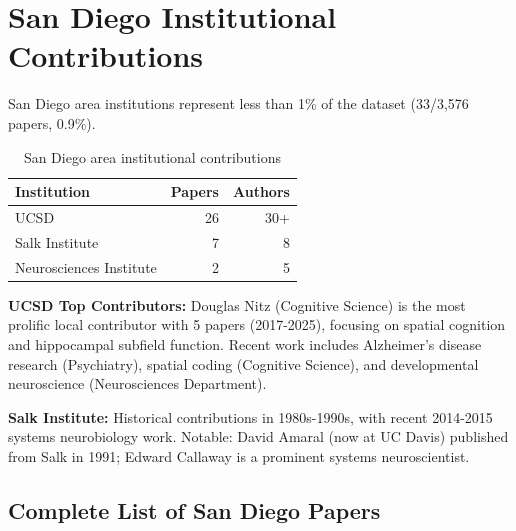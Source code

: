 \documentclass{../latex/analysis_report}
\begin{document}
\clearpage
\section{San Diego Institutional Contributions}
\label{app:sandiego}

San Diego area institutions represent less than 1\% of the dataset (33/3,576 papers, 0.9\%).

\begin{table}[htbp]
\centering
\caption{San Diego area institutional contributions}
\label{tab:sandiego-summary}
\begin{tabular}{lrr}
\toprule
\textbf{Institution} & \textbf{Papers} & \textbf{Authors} \\
\midrule
UCSD & 26 & 30+ \\
Salk Institute & 7 & 8 \\
Neurosciences Institute & 2 & 5 \\
\bottomrule
\end{tabular}
\end{table}

\textbf{UCSD Top Contributors:} Douglas Nitz (Cognitive Science) is the most prolific local contributor with 5 papers (2017-2025), focusing on spatial cognition and hippocampal subfield function. Recent work includes Alzheimer's disease research (Psychiatry), spatial coding (Cognitive Science), and developmental neuroscience (Neurosciences Department).

\textbf{Salk Institute:} Historical contributions in 1980s-1990s, with recent 2014-2015 systems neurobiology work. Notable: David Amaral (now at UC Davis) published from Salk in 1991; Edward Callaway is a prominent systems neuroscientist.

\subsection{Complete List of San Diego Papers}
\end{document}
